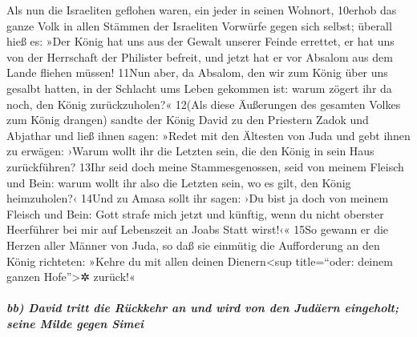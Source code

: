 Als nun die Israeliten geflohen waren, ein jeder in seinen Wohnort,
10erhob das ganze Volk in allen Stämmen der Israeliten Vorwürfe gegen
sich selbst; überall hieß es: »Der König hat uns aus der Gewalt unserer
Feinde errettet, er hat uns von der Herrschaft der Philister befreit,
und jetzt hat er vor Absalom aus dem Lande fliehen müssen! 11Nun aber,
da Absalom, den wir zum König über uns gesalbt hatten, in der Schlacht
ums Leben gekommen ist: warum zögert ihr da noch, den König
zurückzuholen?« 12(Als diese Äußerungen des gesamten Volkes zum König
drangen) sandte der König David zu den Priestern Zadok und Abjathar und
ließ ihnen sagen: »Redet mit den Ältesten von Juda und gebt ihnen zu
erwägen: ›Warum wollt ihr die Letzten sein, die den König in sein Haus
zurückführen? 13Ihr seid doch meine Stammesgenossen, seid von meinem
Fleisch und Bein: warum wollt ihr also die Letzten sein, wo es gilt, den
König heimzuholen?‹ 14Und zu Amasa sollt ihr sagen: ›Du bist ja doch von
meinem Fleisch und Bein: Gott strafe mich jetzt und künftig, wenn du
nicht oberster Heerführer bei mir auf Lebenszeit an Joabs Statt wirst!‹«
15So gewann er die Herzen aller Männer von Juda, so daß sie einmütig die
Aufforderung an den König richteten: »Kehre du mit allen deinen
Dienern\textless sup title=``oder: deinem ganzen Hofe''\textgreater✲
zurück!«

\hypertarget{bb-david-tritt-die-ruxfcckkehr-an-und-wird-von-den-juduxe4ern-eingeholt-seine-milde-gegen-simei}{%
\subparagraph{bb) David tritt die Rückkehr an und wird von den Judäern
eingeholt; seine Milde gegen
Simei}\label{bb-david-tritt-die-ruxfcckkehr-an-und-wird-von-den-juduxe4ern-eingeholt-seine-milde-gegen-simei}}

